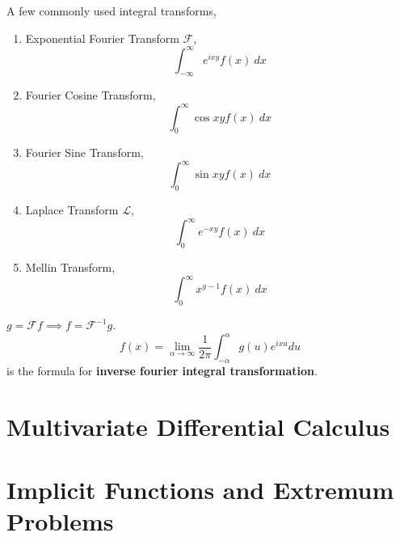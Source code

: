 \begin{remark} A few commonly used integral transforms,
\begin{enumerate}
	\item Exponential Fourier Transform $\mathscr{F}$,
		$$\int_{-\infty}^\infty e^{ixy}f(x)\ dx$$
	\item Fourier Cosine Transform,
		$$\int_0^\infty \cos xy f(x)\ dx$$
	\item Fourier Sine Transform,
		$$\int_0^\infty \sin xy f(x)\ dx$$
	\item Laplace Transform $\mathscr{L}$,
		$$\int_0^\infty e^{-xy} f(x)\ dx$$
	\item Mellin Transform,
		$$\int_0^\infty x^{y-1}f(x)\ dx$$
\end{enumerate}
\end{remark}

\begin{remark}
	$g = \mathscr{F}f \implies f = \mathscr{F}^{-1} g$.\\
	$$f(x) = \lim_{\alpha \to \infty} \frac{1}{2\pi}\int_{-\alpha}^\alpha g(u) e^{ixu} du$$
	is the formula for \textbf{inverse fourier integral transformation}.
\end{remark}

\chapter{Multivariate Differential Calculus}
\chapter{Implicit Functions and Extremum Problems}


